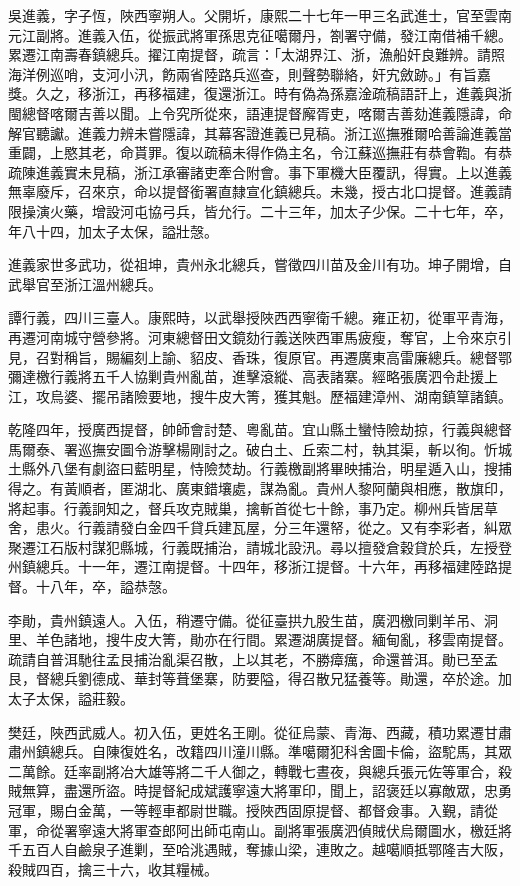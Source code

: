 \begin{pinyinscope}
吳進義，字子恆，陜西寧朔人。父開圻，康熙二十七年一甲三名武進士，官至雲南元江副將。進義入伍，從振武將軍孫思克征噶爾丹，劄署守備，發江南借補千總。累遷江南壽春鎮總兵。擢江南提督，疏言：「太湖界江、浙，漁船奸良難辨。請照海洋例巡哨，支河小汛，飭兩省陸路兵巡查，則聲勢聯絡，奸宄斂跡。」有旨嘉獎。久之，移浙江，再移福建，復還浙江。時有偽為孫嘉淦疏稿語訐上，進義與浙閩總督喀爾吉善以聞。上令究所從來，語連提督廨胥吏，喀爾吉善劾進義隱諱，命解官聽讞。進義力辨未嘗隱諱，其幕客證進義已見稿。浙江巡撫雅爾哈善論進義當重闢，上愍其老，命貰罪。復以疏稿未得作偽主名，令江蘇巡撫莊有恭會鞫。有恭疏陳進義實未見稿，浙江承審諸吏牽合附會。事下軍機大臣覆訊，得實。上以進義無辜廢斥，召來京，命以提督銜署直隸宣化鎮總兵。未幾，授古北口提督。進義請限操演火藥，增設河屯協弓兵，皆允行。二十三年，加太子少保。二十七年，卒，年八十四，加太子太保，謚壯愨。

進義家世多武功，從祖坤，貴州永北總兵，嘗徵四川苗及金川有功。坤子開增，自武舉官至浙江溫州總兵。

譚行義，四川三臺人。康熙時，以武舉授陜西西寧衛千總。雍正初，從軍平青海，再遷河南城守營參將。河東總督田文鏡劾行義送陜西軍馬疲瘦，奪官，上令來京引見，召對稱旨，賜編刻上諭、貂皮、香珠，復原官。再遷廣東高雷廉總兵。總督鄂彌達檄行義將五千人協剿貴州亂苗，進擊滾縱、高表諸寨。經略張廣泗令赴援上江，攻烏婆、擺吊諸險要地，搜牛皮大箐，獲其魁。歷福建漳州、湖南鎮筸諸鎮。

乾隆四年，授廣西提督，帥師會討楚、粵亂苗。宜山縣土蠻恃險劫掠，行義與總督馬爾泰、署巡撫安圖令游擊楊剛討之。破白土、丘索二村，執其渠，斬以徇。忻城土縣外八堡有劇盜曰藍明星，恃險焚劫。行義檄副將畢映捕治，明星遁入山，搜捕得之。有黃順者，匿湖北、廣東錯壤處，謀為亂。貴州人黎阿蘭與相應，散旗印，將起事。行義詗知之，督兵攻克賊巢，擒斬首從七十餘，事乃定。柳州兵皆居草舍，患火。行義請發白金四千貸兵建瓦屋，分三年還帑，從之。又有李彩者，糾眾聚遷江石版村謀犯縣城，行義既捕治，請城北設汛。尋以擅發倉穀貸於兵，左授登州鎮總兵。十一年，遷江南提督。十四年，移浙江提督。十六年，再移福建陸路提督。十八年，卒，謚恭愨。

李勛，貴州鎮遠人。入伍，稍遷守備。從征臺拱九股生苗，廣泗檄同剿羊吊、洞里、羊色諸地，搜牛皮大箐，勛亦在行間。累遷湖廣提督。緬甸亂，移雲南提督。疏請自普洱馳往孟艮捕治亂渠召散，上以其老，不勝瘴癘，命還普洱。勛已至孟艮，督總兵劉德成、華封等葺堡寨，防要隘，得召散兄猛養等。勛還，卒於途。加太子太保，謚莊毅。

樊廷，陜西武威人。初入伍，更姓名王剛。從征烏蒙、青海、西藏，積功累遷甘肅肅州鎮總兵。自陳復姓名，改籍四川潼川縣。準噶爾犯科舍圖卡倫，盜駝馬，其眾二萬餘。廷率副將冶大雄等將二千人御之，轉戰七晝夜，與總兵張元佐等軍合，殺賊無算，盡還所盜。時提督紀成斌護寧遠大將軍印，聞上，詔褒廷以寡敵眾，忠勇冠軍，賜白金萬，一等輕車都尉世職。授陜西固原提督、都督僉事。入覲，請從軍，命從署寧遠大將軍查郎阿出師屯南山。副將軍張廣泗偵賊伏烏爾圖水，檄廷將千五百人自鹼泉子進剿，至哈洮遇賊，奪據山梁，連敗之。越噶順抵鄂隆吉大阪，殺賊四百，擒三十六，收其糧械。


\end{pinyinscope}
